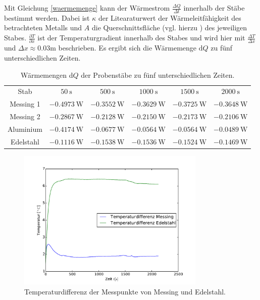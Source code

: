 \noindent Mit Gleichung \eqref{waermemenge} kann der Wärmestrom $\frac{\Delta{Q}}{\Delta{t}}$ innerhalb der Stäbe bestimmt werden. 
Dabei ist $\kappa$ der Litearaturwert der Wärmeleitfähigkeit des betrachteten Metalls und $A$ die Querschnittsfläche (vgl. hierzu \cite{V204}) des jeweiligen Stabes.
$\frac{\partial T}{\partial x}$ ist der Temperaturgradient innerhalb des Stabes und wird hier mit $\frac{\Delta T}{\Delta x}$ und $\Delta x \approx 0.03\si{\meter}$ beschrieben.
Es ergibt sich die Wärmemenge $\mathup{d}Q$ zu fünf unterschiedlichen Zeiten.
\begin{table}
	\centering
	\begin{tabular}{cccccc}
	\sisetup{table-format=1.4}\\
\toprule
	Stab & $50\:\si\second$ & $500\:\si\second$ & $1000\:\si\second$ & $1500\:\si\second$ & $2000\:\si\second$ \\
	\midrule
	Messing 1 &$-0.4973\:\si{\watt}$ &$-0.3552\:\si{\watt}$&$-0.3629\:\si{\watt}$&$-0.3725\:\si{\watt}$&$-0.3648\:\si{\watt}$\\
	Messing 2 &$-0.2867\:\si{\watt}$& $-0.2128\:\si{\watt}$&$-0.2150\:\si{\watt}$&$-0.2173\:\si{\watt}$&$-0.2106\:\si{\watt}$\\
	Aluminium &$-0.4174\:\si{\watt}$&$-0.0677\:\si{\watt}$&$-0.0564\:\si{\watt}$&$-0.0564\:\si{\watt}$&$-0.0489\:\si{\watt}$\\
	Edelstahl &$-0.1116\:\si{\watt}$&$-0.1538\:\si{\watt}$&$-0.1536\:\si{\watt}$&$-0.1524\:\si{\watt}$&$-0.1469\:\si{\watt}$\\
	\bottomrule
	\end{tabular}
	\caption{Wärmemengen d$Q$ der Probenstäbe zu fünf unterschiedlichen Zeiten.}
	\label{tab:waememengen}
\end{table}
\begin{figure}
	\centering
	\includegraphics[width=0.8\textwidth]{Bilder/M1_Tempdiff.pdf}
	\caption{Temperaturdifferenz der Messpunkte von Messing und Edelstahl.}
	\label{fig:tempverl}
\end{figure}

